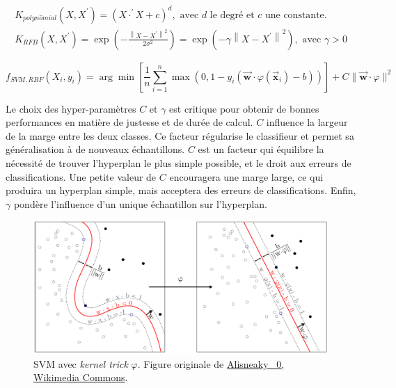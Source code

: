 \begin{equation} \label{eq:kernels}
\begin{split}
K_{polyn\hat{o}mial}\left(X, X^{\prime}\right) = \left(X \cdot ^{\prime} X + c\right)^{d}, \text{ avec } d \text{ le degré et } c \text{ une constante}.
\\
K_{RFB}\left(X, X^{\prime}\right) = \exp \left(-\frac{\left\|X-X^{\prime}\right\|^{2}}{2 \sigma^{2}}\right) = \exp \left(-\gamma\left\|X-X^{\prime}\right\|^{2}\right), \text{ avec } \gamma > 0
\end{split}
\end{equation}

\begin{equation} \label{eq:svm_trick}
f_{SVM,RBF}(X_i, y_i) = \arg \min \left[\frac{1}{n} \sum_{i=1}^{n} \max \left(0, 1-y_{i}\left(\vec{\mathbf{w}} \cdot \varphi(\vec{\mathbf{x}}_{i})-b\right)\right)\right]+ C \|\vec{\mathbf{w}} \cdot \varphi \|^{2}
\end{equation}

Le choix des hyper-paramètres $C$ et $\gamma$ est critique pour obtenir de bonnes performances en matière de justesse et de durée de calcul.
$C$ influence la largeur de la marge entre les deux classes.
Ce facteur régularise le classifieur et permet sa généralisation à de nouveaux échantillons.
$C$ est un facteur qui équilibre la nécessité de trouver l'hyperplan le plus simple possible, et le droit aux erreurs de classifications.
Une petite valeur de $C$ encouragera une marge large, ce qui produira un hyperplan simple, mais acceptera des erreurs de classifications.
Enfin, $\gamma$ pondère l'influence d'un unique échantillon sur l'hyperplan.

\begin{figure}[hbtp]
	\centering
	\includegraphics[width=\textwidth,height=\textheight,keepaspectratio]{../Chap4/Figures/Kernel_Machine_Pierre.pdf}
	\caption{SVM avec \emph{kernel trick} $\varphi$. Figure originale de \href{https://commons.wikimedia.org/wiki/File:Kernel_Machine.png}{Alisneaky \ccLogo \ \textnormal{0}, Wikimedia Commons}.}
	\label{fig:svm}
\end{figure}

